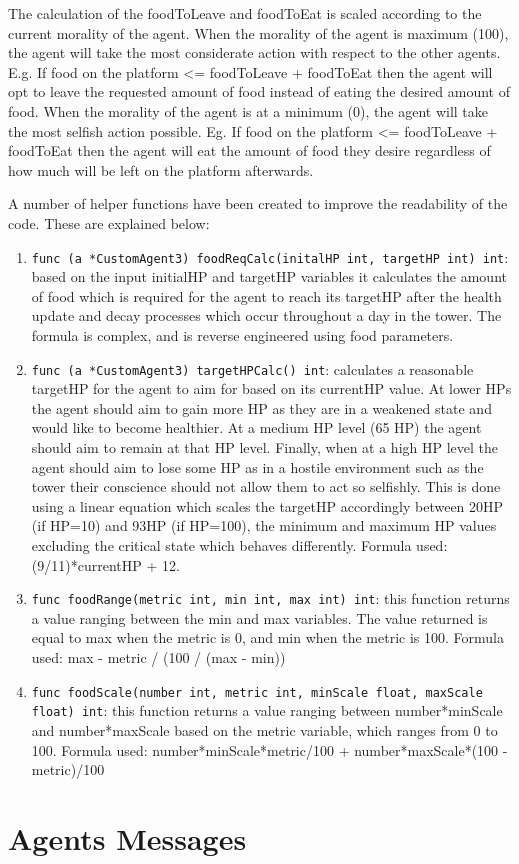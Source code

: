 The calculation of the foodToLeave and foodToEat is scaled according to the current morality of the agent. When the morality of the agent is maximum (100), the agent will take the most considerate action with respect to the other agents. E.g. If food on the platform <= foodToLeave + foodToEat then the agent will opt to leave the requested amount of food instead of eating the desired amount of food. When the morality of the agent is at a minimum (0), the agent will take the most selfish action possible. Eg. If food on the platform <= foodToLeave + foodToEat then the agent will eat the amount of food they desire regardless of how much will be left on the platform afterwards.\par
A number of helper functions have been created to improve the readability of the code. These are explained below:
\begin{enumerate}
    \item \texttt{func (a *CustomAgent3) foodReqCalc(initalHP int, targetHP int) int}: based on the input initialHP and targetHP variables it calculates the amount of food which is required for the agent to reach its targetHP after the health update and decay processes which occur throughout a day in the tower. The formula is complex, and is reverse engineered using food parameters.
    \item \texttt{func (a *CustomAgent3) targetHPCalc() int}: calculates a reasonable targetHP for the agent to aim for based on its currentHP value. At lower HPs the agent should aim to gain more HP as they are in a weakened state and would like to become healthier. At a medium HP level (65 HP) the agent should aim to remain at that HP level. Finally, when at a high HP level the agent should aim to lose some HP as in a hostile environment such as the tower their conscience should not allow them to act so selfishly. This is done using a linear equation which scales the targetHP accordingly between 20HP (if HP=10) and 93HP (if HP=100), the minimum and maximum HP values excluding the critical state which behaves differently. Formula used: (9/11)*currentHP + 12.
    \item \texttt{func foodRange(metric int, min int, max int) int}: this function returns a value ranging between the min and max variables. The value returned is equal to max when the metric is 0, and min when the metric is 100. Formula used: max - metric / (100 / (max - min))
    \item \texttt{func foodScale(number int, metric int, minScale float, maxScale float) int}: this function returns a value ranging between number*minScale and number*maxScale based on the metric variable, which ranges from 0 to 100. Formula used: number*minScale*metric/100 + number*maxScale*(100 - metric)/100
\end{enumerate}

\section{Agents Messages}\label{agents_messages}